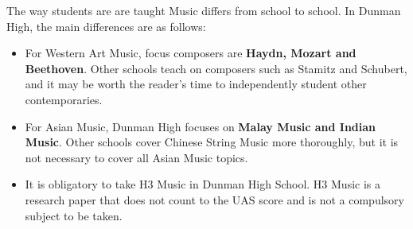 The way students are are taught Music differs from school to school. In Dunman High, the main differences are as follows:
\begin{itemize}
    \item For Western Art Music, focus composers are \textbf{Haydn, Mozart and Beethoven}. Other schools teach on composers such as Stamitz and Schubert, and it may be worth the reader's time to independently student other contemporaries.
    \item For Asian Music, Dunman High focuses on \textbf{Malay Music and Indian Music}. Other schools cover Chinese String Music more thoroughly, but it is not necessary to cover all Asian Music topics.
    \item It is obligatory to take H3 Music in Dunman High School. H3 Music is a research paper that does not count to the UAS score and is not a compulsory subject to be taken.
\end{itemize}
